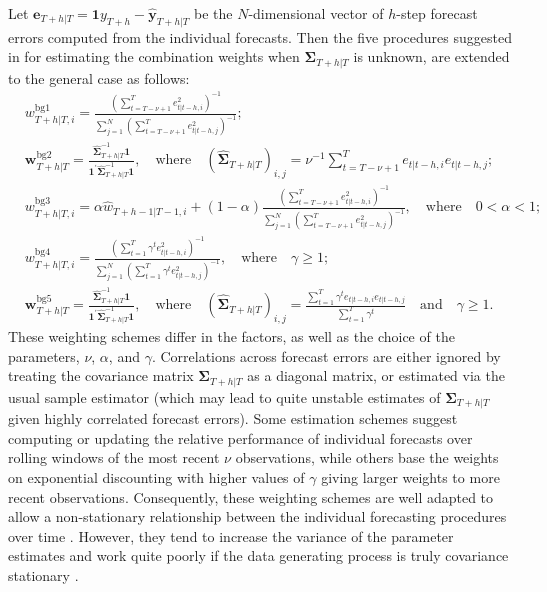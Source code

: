 \documentclass[a4paper,11pt]{article}
\begin{document}
Let $\bm{e}_{T+h|T}=\bm{1} y_{T+h}-\hat{\bm{y}}_{T+h|T}$ be the $N$-dimensional vector of $h$-step forecast errors computed from the individual forecasts. Then the five procedures suggested in \citet{Bates1969-yj} for estimating the combination weights when $\bm{\Sigma}_{T+h|T}$ is unknown, are extended to the general case as follows:
\begin{align}
  & w_{T+h|T, i}^{\text{bg1}}=\frac{\left( \sum_{t=T-\nu+1}^{T} e_{t|t-h, i}^{2} \right)^{-1}}{\sum_{j=1}^{N}\left(\sum_{t=T-\nu+1}^{T} e_{t|t-h, j}^{2}\right)^{-1}}; \label{eq:weight_bg1} \\
  & \bm{w}_{T+h|T}^{\text{bg2}}=\frac{\hat{\bm{\Sigma}}_{T+h|T}^{-1}\bm{1}}{\bm{1}^{\prime} \hat{\bm{\Sigma}}_{T+h|T}^{-1} \bm{1}}, \quad \text{where} \quad (\hat{\bm{\Sigma}}_{T+h|T})_{i, j}=\nu^{-1} \sum_{t=T-\nu+1}^{T} e_{t|t-h, i} e_{t|t-h, j};   \\
  & w_{T+h|T, i}^{\text{bg3}}=\alpha \hat{w}_{T+h-1|T-1, i} + (1-\alpha) \frac{\left( \sum_{t=T-\nu+1}^{T} e_{t|t-h, i}^{2} \right)^{-1}}{\sum_{j=1}^{N}\left(\sum_{t=T-\nu+1}^{T} e_{t|t-h, j}^{2}\right)^{-1}}, \quad \text{where} \quad 0<\alpha<1;   \\
  & w_{T+h|T, i}^{\text{bg4}}=\frac{\left( \sum_{t=1}^{T} \gamma^{t} e_{t|t-h, i}^{2} \right)^{-1}}{\sum_{j=1}^{N}\left(\sum_{t=1}^{T} \gamma^{t} e_{t|t-h, j}^{2}\right)^{-1}}, \quad \text{where} \quad \gamma \geq 1; \label{eq:weight_bg4}  \\
  & \bm{w}_{T+h|T}^{\text{bg5}}=\frac{\hat{\bm{\Sigma}}_{T+h|T}^{-1}\bm{1}}{\bm{1}^{\prime} \hat{\bm{\Sigma}}_{T+h|T}^{-1} \bm{1}}, \quad \text{where} \quad (\hat{\bm{\Sigma}}_{T+h|T})_{i, j}=\frac{\sum_{t=1}^{T} \gamma^{t} e_{t|t-h, i} e_{t|t-h, j}}{\sum_{t=1}^{T} \gamma^{t}} \quad \text{and} \quad \gamma \geq 1.
\end{align}
These weighting schemes differ in the factors, as well as the choice of the parameters, $\nu$, $\alpha$, and $\gamma$. Correlations across forecast errors are either ignored by treating the covariance matrix $\bm{\Sigma}_{T+h|T}$ as a diagonal matrix, or estimated via the usual sample estimator (which may lead to quite unstable estimates of $\bm{\Sigma}_{T+h|T}$ given highly correlated forecast errors). Some estimation schemes suggest computing or updating the relative performance of individual forecasts over rolling windows of the most recent $\nu$ observations, while others base the weights on exponential discounting with higher values of $\gamma$ giving larger weights to more recent observations. Consequently, these weighting schemes are well adapted to allow a non-stationary relationship between the individual forecasting procedures over time \citep{Newbold1974-lp}. However, they tend to increase the variance of the parameter estimates and work quite poorly if the data generating process is truly covariance stationary \citep{Timmermann2006-en}.
\end{document}
